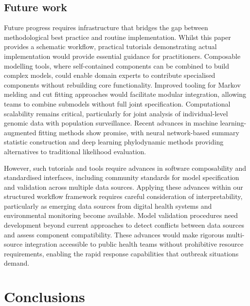 \documentclass{article}
\begin{document}
\begin{enumerate}
\subsection{Future work}

Future progress requires infrastructure that bridges the gap between methodological best practice and routine implementation.
Whilst this paper provides a schematic workflow, practical tutorials demonstrating actual implementation would provide essential guidance for practitioners.
Composable modelling tools, where self-contained components can be combined to build complex models, could enable domain experts to contribute specialised components without rebuilding core functionality.
Improved tooling for Markov melding and cut fitting approaches would facilitate modular integration, allowing teams to combine submodels without full joint specification.
Computational scalability remains critical, particularly for joint analysis of individual-level genomic data with population surveillance.
Recent advances in machine learning-augmented fitting methods show promise, with neural network-based summary statistic construction \citep{raynal2019abc} and deep learning phylodynamic methods \citep{voznica2022deep} providing alternatives to traditional likelihood evaluation.

However, such tutorials and tools require advances in software composability and standardised interfaces, including community standards for model specification and validation across multiple data sources.
Applying these advances within our structured workflow framework requires careful consideration of interpretability, particularly as emerging data sources from digital health systems and environmental monitoring become available.
Model validation procedures need development beyond current approaches to detect conflicts between data sources and assess component compatibility.
These advances would make rigorous multi-source integration accessible to public health teams without prohibitive resource requirements, enabling the rapid response capabilities that outbreak situations demand.

\section{Conclusions}


\end{enumerate}
\end{document}

